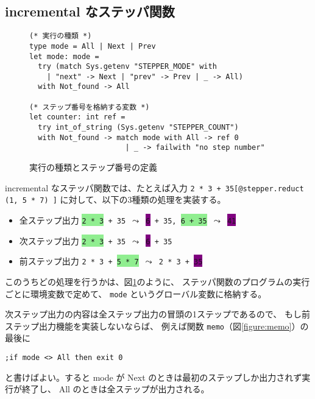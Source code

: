 \subsection{incremental なステッパ関数}

\begin{figure}[t]
\begin{spacing}{0.8}
\begin{verbatim}
(* 実行の種類 *)
type mode = All | Next | Prev
let mode: mode =
  try (match Sys.getenv "STEPPER_MODE" with
    | "next" -> Next | "prev" -> Prev | _ -> All)
  with Not_found -> All

(* ステップ番号を格納する変数 *)
let counter: int ref =
  try int_of_string (Sys.getenv "STEPPER_COUNT")
  with Not_found -> match mode with All -> ref 0
                      | _ -> failwith "no step number"
\end{verbatim}
\end{spacing}
\caption{実行の種類とステップ番号の定義}
\label{figure:mode}
\end{figure}

incremental なステッパ関数では、たとえば入力 \texttt{2 * 3 + 35[@stepper.reduct (1, 5 * 7) ]} に対して、以下の3種類の処理を実装する。

\begin{itemize}
\item 全ステップ出力 \texttt{\colorbox{lightgreen}{2 * 3} + 35 $\leadsto$ \colorbox{purple}{6} + 35, \colorbox{lightgreen}{6 + 35} $\leadsto$ \colorbox{purple}{41}}
\item 次ステップ出力 \texttt{\colorbox{lightgreen}{2 * 3} + 35 $\leadsto$ \colorbox{purple}{6} + 35}
\item 前ステップ出力 \texttt{2 * 3 + \colorbox{lightgreen}{5 * 7} $\leadsto$ 2 * 3 + \colorbox{purple}{35}}
\end{itemize}

このうちどの処理を行うかは、図\ref{figure:mode}のように、
ステッパ関数のプログラムの実行ごとに環境変数で定めて、
\texttt{mode} というグローバル変数に格納する。

次ステップ出力の内容は全ステップ出力の冒頭の1ステップであるので、
もし前ステップ出力機能を実装しないならば、
例えば関数 \texttt{memo}（図\ref{figure:memo}）の最後に
\begin{verbatim}
;if mode <> All then exit 0
\end{verbatim}
と書けばよい。すると mode が Next のときは最初のステップしか出力されず実行が終了し、
All のときは全ステップが出力される。

